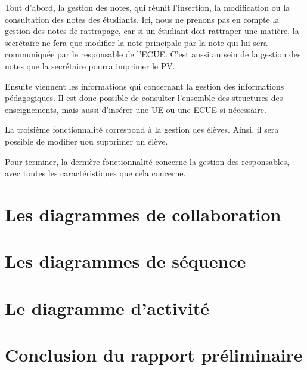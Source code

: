 \documentclass[letter, 12pt] {article}
\begin{document}
	Tout d'abord, la gestion des notes, qui réunit l'insertion, la modification ou la consultation des notes des étudiants.
	Ici, nous ne prenons pas en compte la gestion des notes de rattrapage, car si un étudiant doit rattraper une matière, la secrétaire ne fera que modifier la note principale par la note qui lui sera communiquée par le responsable de l'ECUE. C'est aussi au sein de la gestion des notes que la secrétaire pourra imprimer le PV.
	
	Ensuite viennent les informations qui concernant la gestion des informations pédagogiques. Il est donc possible de consulter l'ensemble des structures des enseignements, mais aussi d'insérer une UE ou une ECUE si nécessaire.
	
	La troisième fonctionnalité correspond à la gestion des élèves. Ainsi, il sera possible de modifier uou supprimer un élève.
	
	Pour terminer, la dernière fonctionnalité concerne la gestion des responsables, avec toutes les caractéristiques que cela concerne.
	
	\section{Les diagrammes de collaboration}
	
	\section{Les diagrammes de séquence}
	
	\section{Le diagramme d'activité}
	
	\section{Conclusion du rapport préliminaire}
	
		
		
\end{document}
